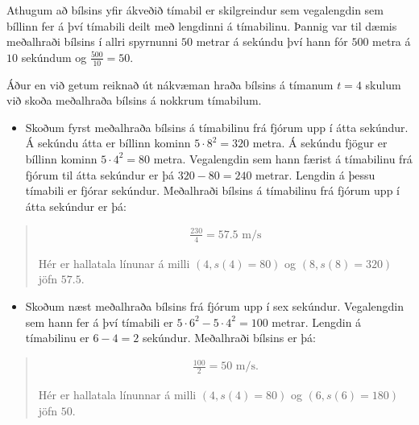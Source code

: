 \documentclass[a4paper,10pt,icelandic]{sphinxmanual}
\begin{document}
Athugum að  bílsins yfir ákveðið tímabil er skilgreindur sem vegalengdin sem bíllinn fer á því tímabili deilt með lengdinni á tímabilinu.
Þannig var til dæmis meðalhraði bílsins í allri spyrnunni \(50\) metrar á sekúndu því hann fór \(500\) metra á \(10\) sekúndum og \(\frac{500}{10} = 50\).

Áður en við getum reiknað út nákvæman hraða bílsins á tímanum \(t = 4\) skulum við skoða meðalhraða bílsins á nokkrum tímabilum.
\begin{itemize}
\item {} 
Skoðum fyrst meðalhraða bílsins á tímabilinu frá fjórum upp í átta sekúndur. Á sekúndu átta er bíllinn kominn \(5 \cdot 8^2 = 320\) metra.
Á sekúndu fjögur er bíllinn kominn \(5 \cdot 4^2 = 80\) metra.
Vegalengdin sem hann færist á tímabilinu frá fjórum til átta sekúndur er þá \(320 − 80 = 240\) metrar.
Lengdin á þessu tímabili er fjórar sekúndur. Meðalhraði bílsins á tímabilinu frá fjórum upp í átta sekúndur er þá:

\end{itemize}
\begin{quote}
\begin{equation*}
\begin{split}\frac{230}{4} = 57.5 \text{ m/s}\end{split}
\end{equation*}

Hér er hallatala línunar á milli \((4, s(4) = 80)\) og \((8, s(8) = 320)\) jöfn \(57.5\).
\end{quote}
\begin{itemize}
\item {} 
Skoðum næst meðalhraða bílsins frá fjórum upp í sex sekúndur.
Vegalengdin sem hann fer á því tímabili er \(5 \cdot 6^2 −5 \cdot 4^2 = 100\) metrar.
Lengdin á tímabilinu er \(6 − 4 = 2\) sekúndur. Meðalhraði bílsins er þá:

\end{itemize}
\begin{quote}
\begin{equation*}
\begin{split}\frac{100}{2} = 50 \text{ m/s}.\end{split}
\end{equation*}

Hér er hallatala línunnar á milli \((4, s(4) = 80)\) og \((6, s(6) = 180)\) jöfn \(50\).
\end{quote}
\end{document}
